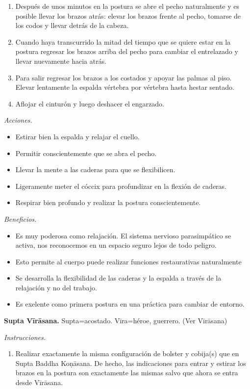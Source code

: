 \begin{enumerate}
traer la mente a la postura. Observar la
mente, las sensaciones físicas y las
emociones. Percibir sin juzgar. Respirar más.
\item Después de unos minutos en la postura
se abre el pecho naturalmente y es posible
llevar los brazos atrás: elevar los brazos
frente al pecho, tomarse de los codos y
llevar detrás de la cabeza.
\item Cuando haya transcurrido la mitad del
tiempo que se quiere estar en la postura
regresar los brazos arriba del pecho para
cambiar el entrelazado y llevar nuevamente
hacia atrás.
\item Para salir regresar los brazos a los
costados y apoyar las palmas al piso. Elevar
lentamente la espalda vértebra por vértebra
hasta hestar sentado.
\item Aflojar el cinturón y luego deshacer el
engarzado.
\end{enumerate}

\emph{Acciones.}
\begin{itemize}
\item Estirar bien la espalda y relajar el
cuello.
\item Permitir conscientemente que se abra el
pecho.
\item Llevar la mente a las caderas para que
se flexibilicen.
\item Ligeramente meter el cóccix para
profundizar en la flexión de caderas.
\item Respirar bien profundo y realizar la
postura conscientemente.
\end{itemize}

\emph{Beneficios.}
\begin{itemize}
\item Es muy poderosa como relajación. El
sistema nervioso parasimpático se activa, nos
reconocemos en un espacio seguro lejos de
todo peligro.
\item Esto permite al cuerpo puede realizar
funciones restaurativas naturalmente
\item Se desarrolla la flexibilidad de las
caderas y la espalda a través de la
relajación y no del trabajo.
\item Es exelente como primera postura en una
práctica para cambiar de entorno.
\end{itemize}

\medskip\noindent\textbf{Supta Vīrāsana.}
Supta=acostado. Vīra=héroe, guerrero. (Ver
Vīrāsana)

\emph{Instrucciones.}
\begin{enumerate}
\item Realizar exactamente la misma
configuración de bolster y cobija(s) que en
Supta Baddha Koṇāsana. De hecho, las
indicaciones para entrar y estirar los brazos
en la postura son exactamente las mismas
salvo que ahora se entra desde Vīrāsana.
\end{enumerate}

